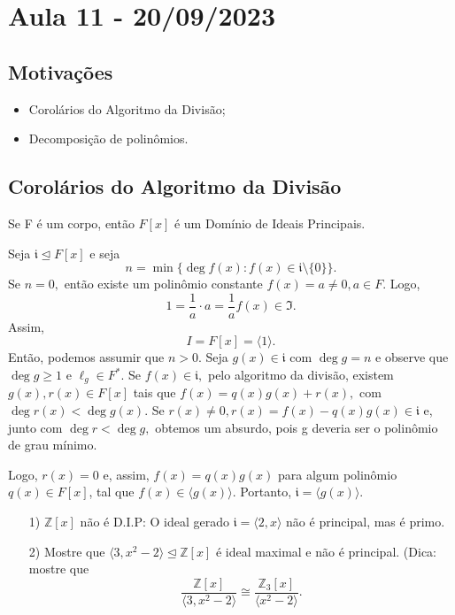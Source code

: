 \documentclass[algebraII_notes.tex]{subfiles}
\begin{document}
\section{Aula 11 - 20/09/2023}
\subsection{Motivações}
\begin{itemize}
	\item Corolários do Algoritmo da Divisão;
	\item Decomposição de polinômios.
\end{itemize}
\subsection{Corolários do Algoritmo da Divisão}
\begin{prop*}
	Se F é um corpo, então \(F[x]\) é um Domínio de Ideais Principais.
\end{prop*}
\begin{proof*}
	Seja \(\mathfrak{i} \trianglelefteq{F[x]}\) e seja
	\[
		n = \min\{\deg{f(x)}: f(x)\in \mathfrak{i}\setminus{\{0\}}\}.
	\]
	Se \(n=0,\) então existe um polinômio constante \(f(x) = a\neq 0, a\in F.\) Logo,
	\[
		1 = \frac{1}{a}\cdot a = \frac{1}{a}f(x)\in \mathfrak{I}.
	\]
	Assim,
	\[
		I = F[x] = \langle 1 \rangle.
	\]
	Então, podemos assumir que \(n > 0\). Seja \(g(x)\in \mathfrak{i}\) com \(\deg{g} = n\) e observe que
	\(\deg{g}\geq 1\) e \(\ell_{g}\in F^{*}\). Se \(f(x)\in \mathfrak{i},\) pelo algoritmo da divisão, existem
	\(g(x), r(x)\in F[x]\) tais que \(f(x) = q(x)g(x) + r(x),\) com \(\deg{r(x)} < \deg{g(x)}.\) Se \(r(x)\neq0, r(x) = f(x)
	- q(x)g(x)\in \mathfrak{i}\) e, junto com \(\deg{r} < \deg{g},\) obtemos um absurdo, pois g deveria ser o polinômio de
	grau mínimo.

	Logo, \(r(x) = 0\) e, assim, \(f(x) = q(x)g(x)\) para algum polinômio \(q(x)\in F[x]\), tal que \(f(x)\in \langle g(x) \rangle.\)
	Portanto, \(\mathfrak{i} = \langle g(x) \rangle.\) \qedsymbol
\end{proof*}
\begin{example}[Exercício]
	\begin{itemize}
		\item[1)] \(\mathbb{Z}[x]\) não é D.I.P: O ideal gerado \(\mathfrak{i} = \langle 2, x \rangle\) não é principal, mas é primo.
		\item[2)] Mostre que \(\langle 3, x^{2}-2 \rangle \trianglelefteq{\mathbb{Z}[x]}\) é ideal maximal e não é principal. (Dica:
		      mostre que
		      \[
			      \frac{\mathbb{Z}[x]}{\langle 3, x^{2}-2 \rangle}\cong{\frac{\mathbb{Z}_{3}[x]}{\langle x^{2}-2 \rangle}}.
		      \]
	\end{itemize}
\end{example}
\end{document}
